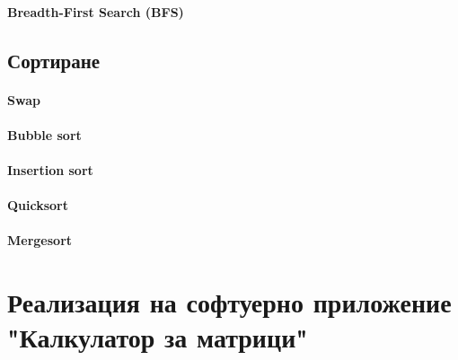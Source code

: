 \documentclass[oneside]{book}
\begin{document}
\subsubsection{Breadth-First Search (BFS)}

\section{Сортиране}
\subsubsection{Swap}
\subsubsection{Bubble sort}
\subsubsection{Insertion sort}
\subsubsection{Quicksort}
\subsubsection{Mergesort}

\chapter*{Реализация на софтуерно приложение "Калкулатор за матрици"}
\end{document}
